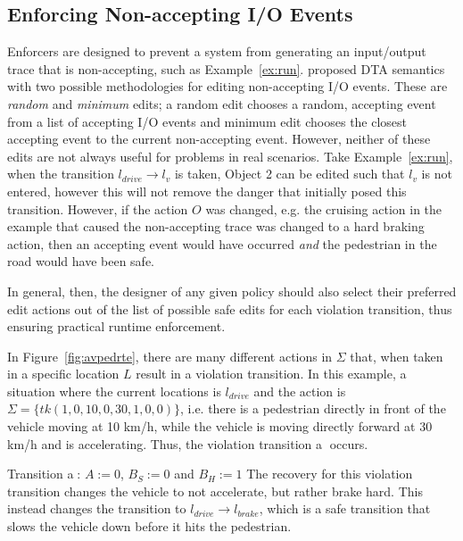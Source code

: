 \subsection{Enforcing Non-accepting I/O Events}
Enforcers are designed to prevent a system from generating an input/output trace that is non-accepting, such as Example~\ref{ex:run}.
\cite{recps} proposed \ac{DTA} semantics with two possible methodologies for editing non-accepting I/O events.
These are \textit{random} and \textit{minimum} edits; a random edit chooses a random, accepting event from a list of accepting I/O events and minimum edit chooses the closest accepting event to the current non-accepting event.
However, neither of these edits are not always useful for problems in real scenarios.
Take Example~\ref{ex:run}, when the transition $l_{drive} \rightarrow l_v$ is taken, Object 2 can be edited such that $l_v$ is not entered, however this will not remove the danger that initially posed this transition.
However, if the action ${O}$ was changed, e.g. the cruising action in the example that caused the non-accepting trace was changed to a hard braking action, then an accepting event would have occurred \textit{and} the pedestrian in the road would have been safe.

In general, then, the designer of any given policy should also select their preferred edit actions out of the list of possible safe edits for each violation transition, thus ensuring practical runtime enforcement.

\begin{example}
	In Figure~\ref{fig:avpedrte}, there are many different actions in $\Sigma$ that, when taken in a specific location $L$ result in a violation transition.
	In this example, a situation where the current locations is $l_{drive}$ and the action is $\Sigma = \{tk(1, 0, 10, 0, 30, 1, 0, 0)\}$, i.e. there is a pedestrian directly in front of the vehicle moving at 10 km/h, while the vehicle is moving directly forward at 30 km/h and is accelerating.
	Thus, the violation transition \textcircled{a} occurs.
	\squishlist
	\item Transition \textcircled{a}: $A := 0$, $B_S := 0$ and $B_H := 1$
	\squishend
	The recovery for this violation transition changes the vehicle to not accelerate, but rather brake hard.
	This instead changes the transition to $l_{drive} \rightarrow l_{brake}$, which is a safe transition that slows the vehicle down before it hits the pedestrian.
\end{example}














